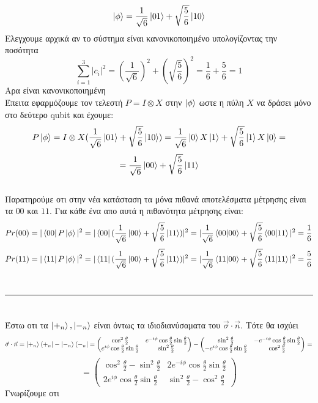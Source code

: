 \documentclass[12pt]{article}
\begin{document}
\section*{{}}
$$\ket{\phi} = \frac{1}{\sqrt{6}}\ket{01}+\sqrt{\frac{5}{6}}\ket{10}$$
Ελεγχουμε αρχικά αν το σύστημα είναι κανονικοποιημένο υπολογίζοντας την ποσότητα
$$ \sum_{i=1}^{3}|c_i|^2 = (\frac{1}{\sqrt{6}})^2+ (\sqrt{\frac{5}{6}})^2=\frac{1}{6} +\frac{5}{6} =1$$
Αρα είναι κανονικοποιημένη\\
Έπειτα εφαρμόζουμε τον τελεστή $P= I \otimes X$ στην $\ket{\phi}$ ωστε η πύλη $X$ να δράσει μόνο στο δεύτερο \textlatin{qubit} και έχουμε:
$$P\ket{\phi} = I \otimes X(\frac{1}{\sqrt{6}}\ket{01}+\sqrt{\frac{5}{6}}\ket{10}) = \frac{1}{\sqrt{6}}\ket{0}X\ket{1}+\sqrt{\frac{5}{6}}\ket{1}X\ket{0}=$$
$$=\frac{1}{\sqrt{6}}\ket{00}+\sqrt{\frac{5}{6}}\ket{11}$$\\
Παρατηρούμε οτι στην νέα κατάσταση τα μόνα πιθανά αποτελέσματα μέτρησης είναι τα $00$ και $11$. Για κάθε ένα απο αυτά η πιθανότητα μέτρησης είναι:
$$Pr(00) = |\bra{00}P\ket{\phi}|^2 = |\bra{00}(\frac{1}{\sqrt{6}}\ket{00}+\sqrt{\frac{5}{6}}\ket{11})|^2 
= |\frac{1}{\sqrt{6}}\braket{00|00}+\sqrt{\frac{5}{6}}\braket{00|11}|^2 = \frac{1}{6}$$ 
$$Pr(11) = |\bra{11}P\ket{\phi}|^2 = |\bra{11}(\frac{1}{\sqrt{6}}\ket{00}+\sqrt{\frac{5}{6}}\ket{11})|^2 
= |\frac{1}{\sqrt{6}}\braket{11|00}+\sqrt{\frac{5}{6}}\braket{11|11}|^2 = \frac{5}{6}$$ \
\rule{\textwidth}{.5pt}
\section*{{\bfΆσκηση 7.1 }}

Έστω οτι τα $\ket{+_n} , \ket{-_n}$ είναι όντως τα ιδιοδιανύσαματα του $\vec{\sigma}\cdot \vec{n}$. Τότε θα ισχύει
$$\vec{\sigma}\cdot \vec{n} =\ket{+_n}\bra{+_n} - \ket{-_n}\bra{-_n}  = \begin{pmatrix}\cos^2\frac{\theta}{2} & e^{-i\phi}\cos{\frac{\theta}{2}}\sin{\frac{\theta}{2}} \\ e^{i\phi}\cos{\frac{\theta}{2}}\sin{\frac{\theta}{2}} &\sin^2\frac{\theta}{2} \end{pmatrix} 
- \begin{pmatrix}\sin^2\frac{\theta}{2} & -e^{-i\phi}\cos{\frac{\theta}{2}}\sin{\frac{\theta}{2}} \\ -e^{i\phi}\cos{\frac{\theta}{2}}\sin{\frac{\theta}{2}} &\cos^2\frac{\theta}{2} \end{pmatrix}  = $$ 
$$ =  \begin{pmatrix}\cos^2\frac{\theta}{2} - \sin^2\frac{\theta}{2} & 2e^{-i\phi}\cos{\frac{\theta}{2}}\sin{\frac{\theta}{2}} \\ 2e^{i\phi}\cos{\frac{\theta}{2}}\sin{\frac{\theta}{2}} &\sin^2\frac{\theta}{2}-\cos^2\frac{\theta}{2} \end{pmatrix} $$
Γνωρίζουμε οτι 
\end{document}
